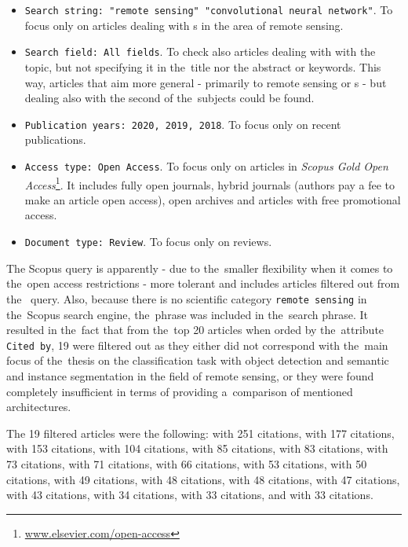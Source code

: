\begin{itemize}
	\item \verb|Search string: "remote sensing" "convolutional neural network"|. To focus only on articles dealing with s in the area of remote sensing.
	\item \verb|Search field: All fields|. To check also articles dealing with with the topic, but not specifying it in the~title nor the abstract or keywords. This way, articles that aim more general - primarily to remote sensing or s - but dealing also with the second of the~subjects could be found.
	\item \verb|Publication years: 2020, 2019, 2018|. To focus only on recent publications.
	\item \verb|Access type: Open Access|. To focus only on articles in \textit{Scopus Gold Open Access}\footnote{\url{www.elsevier.com/open-access}}. It includes fully open journals, hybrid journals (authors pay a fee to make an article open access), open archives and articles with free promotional access.
	\item \verb|Document type: Review|. To focus only on reviews.
\end{itemize}

The Scopus query is apparently - due to the~smaller flexibility when it comes to the~open access restrictions - more tolerant and includes articles filtered out from the~ query. Also, because there is no scientific category \verb|remote sensing| in the~Scopus search engine, the~phrase was included in the~search phrase. It resulted in the~fact that from the~top 20 articles when orded by the~attribute \verb|Cited by|, 19 were filtered out as they either did not correspond with the~main focus of the~thesis on the classification task with object detection and semantic and instance segmentation in the field of remote sensing, or they were found completely insufficient in terms of providing a~comparison of mentioned architectures.

The 19 filtered articles were the following: \cite{dl-for-cv} with 251 citations, \cite{review-ml-in-rs} with 177 citations, \cite{review-ml-agriculture} with 153 citations, \cite{review-uav-applications} with 104 citations, \cite{state-of-the-art-ann} with 85 citations, \cite{lc-2-0} with 83 citations, \cite{state-of-the-art-dl} with 73 citations, \cite{review-water-dl} with 71 citations, \cite{review-plant-stress} with 66 citations, \cite{review-text-class} with 53 citations, \cite{cv-animal-ecology} with 50 citations, \cite{review-cv-infra-inspections} with 49 citations, \cite{review-ann-plant-disease} with 48 citations, \cite{review-st-fusion-multisource} with 48 citations, \cite{review-ml-energy} with 47 citations, \cite{review-bd-disaster} with 43 citations, \cite{review-uav-rs} with 34 citations, \cite{nanophotonics} with 33 citations, and \cite{review-point-clouds} with 33 citations.

